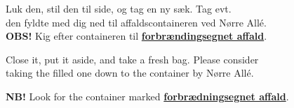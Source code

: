 \documentclass{article}
\begin{document}
\maketitle

\null
\vspace{-1.5cm}


\vspace{-0.4in}

\begin{center}

\huge Luk den, stil den til side, og tag en ny sæk. Tag evt. \\ den fyldte med dig ned til affaldscontaineren ved Nørre Allé. \\
\textbf{OBS!} Kig efter containeren til \underline{\textbf{forbrændingsegnet affald}}.

\end{center}

\english


\vspace{-0.4in}

\begin{center}

\huge Close it, put it aside, and take a fresh bag. Please consider \\ taking
the filled one down to the container by Nørre Allé.

\textbf{NB!} Look for the container marked \underline{\textbf{forbrædningsegnet affald}}.

\end{center}

\dansk

\underskriv
\end{document}
